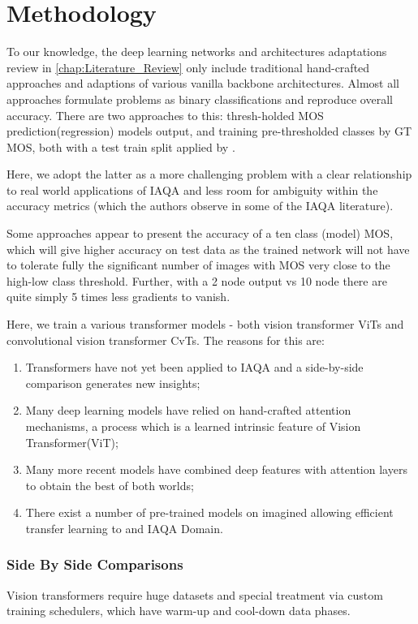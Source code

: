 
\chapter{Methodology}
\label{chap:Methodology}

To our knowledge, the deep learning networks and architectures adaptations review in \ref{chap:Literature_Review} only include traditional hand-crafted approaches and adaptions of various vanilla backbone architectures. Almost all approaches formulate problems as binary classifications and reproduce overall accuracy. There are two approaches to this: thresh-holded MOS prediction(regression) models output, and training pre-thresholded classes by GT MOS, both with a test train split applied by \cite{Talebi2018,Murray2012}. 

Here, we adopt the latter as a more challenging problem with a clear relationship to real world applications of IAQA and less room for ambiguity within the accuracy metrics (which the authors observe in some of the IAQA literature). 

Some approaches appear to present the accuracy of a ten class (model) MOS, which will give higher accuracy on test data as the trained network will not have to tolerate fully the significant number of images with MOS very close to the high-low class threshold. Further, with a 2 node output vs 10 node there are quite simply 5 times less gradients to vanish. 

Here, we train a various transformer models - both vision transformer ViTs and convolutional vision transformer CvTs. The reasons for this are: \begin{enumerate}
    \item Transformers have not yet been applied to IAQA and a side-by-side comparison generates new insights;
    \item Many deep learning models have relied on hand-crafted attention mechanisms, a process which is a learned intrinsic feature of Vision Transformer(ViT);
    \item Many more recent models have combined deep features with attention layers to obtain the best of both worlds;
    \item There exist a number of pre-trained models on imagined allowing efficient transfer learning to and IAQA Domain.
\end{enumerate}

\subsection{Side By Side Comparisons}
\label{side by side}
Vision transformers require huge datasets and special treatment via custom training schedulers, which have warm-up and cool-down data phases. 

